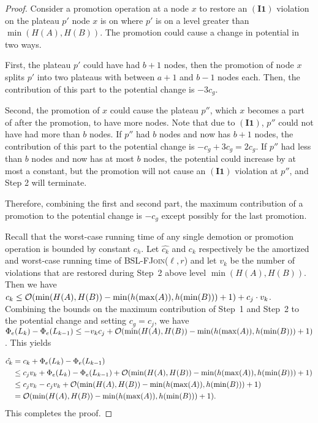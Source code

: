 \documentclass[11pt]{article}
\newcommand{\Bslfjoinx}[2]{\mbox{\textsc{BSL-FJoin(\ensuremath{#1,#2})}}}
\newcommand{\cons}[1]{\ensuremath{c_{#1}}}
\newcommand{\cnsg}{\cons g}
\newcommand{\cnsh}{\cons h}
\newcommand{\cnsj}{\cons j}
\newcommand{\invone}{\ensuremath{\mathbf{(I1)}}}
\newcommand{\nodeheight}[1]{\ensuremath{h(#1)}}
\newcommand{\intheight}[1]{\ensuremath{H(#1)}}
\newcommand{\intmax}[1]{\ensuremath{\max(\intl #1)}}
\newcommand{\intmin}[1]{\ensuremath{\min(\intl #1)}}
\newcommand{\intl}[1]{\ensuremath{#1}}
\newcommand{\node}[1]{\ensuremath{#1}}
\newcommand{\indatast}[1]{\ensuremath{L_{#1}}}
\newcommand{\locpotfun}[1]{\ensuremath{\Phi_{e}(#1)}}
\newcommand{\vionum}[1]{\ensuremath{v_{#1}}}
\newcommand{\amcost}[1]{\ensuremath{\hat{c_{#1}}}}
\newcommand{\actcost}[1]{\ensuremath{c_{#1}}}
\begin{document}
\begin{proof}
Consider a promotion operation at a node $x$ to restore an \invone{} violation on the plateau $p'$ node \node x is on where $p'$ is on a level greater than $\min(\intheight A, \intheight B)$. The promotion could cause a change in potential in two ways. 


First, the plateau $p'$ could have had $b+1$ nodes, then the promotion of node \node x splits $p'$ into two plateaus with between $a+1$ and $b-1$ nodes each. Then, the contribution of this part to the potential change is $-3\cnsg$. 


Second, the promotion of $x$ could cause the plateau $p''$, which $x$ becomes a part of after the promotion, to have more nodes. Note that due to \invone{}, $p''$ could not have had more than $b$ nodes. If $p''$ had $b$ nodes and now has $b+1$ nodes, the contribution of this part to the potential change is $-\cnsg + 3\cnsg = 2\cnsg$. If $p''$ had less than $b$ nodes and now has at most $b$ nodes, the potential could increase by at most a constant, but the promotion will not cause an \invone{} violation at $p''$, and Step 2 will terminate.


Therefore, combining the first and second part, the maximum contribution of a promotion to the potential change is $-\cnsg$ except possibly for the last promotion. 


Recall that the worst-case running time of any single demotion or promotion operation is bounded by constant \cnsh. Let \amcost k and \actcost k respectively be the amortized and worst-case running time of \Bslfjoinx{\ell}{r} and let \vionum k be the number of violations that are restored during Step~2 above level $\min(\intheight{A},\intheight{B})$. 
Then we have $\actcost k \leq {\cal O}(\min(\intheight{A},\intheight{B}) - \min(\nodeheight{\intmax{A}}, \nodeheight{\intmin{B}})+1) + \cnsj\cdot \vionum k$. 
Combining the bounds on the maximum contribution of Step~1 and Step~2 to the potential change and setting $\cnsg = \cnsj$, we have $\locpotfun{\indatast k} - \locpotfun{\indatast{k-1}} \leq -\vionum k \cnsj + {\cal O}(\min(\intheight{A},\intheight{B}) - \min(\nodeheight{\intmax{A}}, \nodeheight{\intmin{B}})+1)$. 
This yields 

\begin{align*} 
\amcost{k} &= \actcost k + \locpotfun{\indatast k} - \locpotfun{\indatast{k-1}}\\ 
&\leq \cnsj\vionum k + \locpotfun{\indatast k} - \locpotfun{\indatast{k-1}}+ {\cal O}(\min(\intheight{A},\intheight{B}) - \min(\nodeheight{\intmax{A}}, \nodeheight{\intmin{B}})+1)\\ 
&\leq \cnsj\vionum k - \cnsj\vionum k +  {\cal O}(\min(\intheight{A},\intheight{B}) - \min(\nodeheight{\intmax{A}}, \nodeheight{\intmin{B}})+1) \\ 
&= {\cal O}(\min(\intheight{A},\intheight{B}) - \min(\nodeheight{\intmax{A}}, \nodeheight{\intmin{B}})+1). 
\end{align*} 
This completes the proof. 
\end{proof} 
\end{document}
